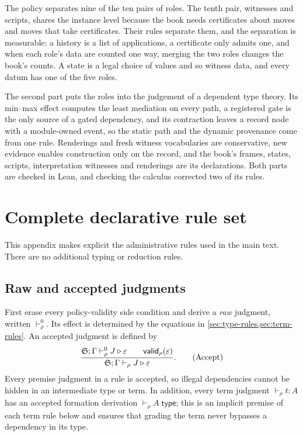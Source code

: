 \documentclass[11pt]{article}
\numberwithin{equation}{section}
\theoremstyle{definition}
\theoremstyle{plain}
\theoremstyle{remark}
\newcommand{\eps}{\varepsilon}
\newcommand{\valid}{\mathsf{valid}}
\newcommand{\jtype}{\mathrel{\mathsf{type}}}
\begin{document}
The policy separates nine of the ten pairs of roles.  The tenth pair,
witnesses and scripts, shares the instance level because the book needs
certificates about moves and moves that take certificates.  Their rules
separate them, and the separation is measurable: a history is a list of
applications, a certificate only admits one, and when each role's data are
counted one way, merging the two roles changes the book's counts.  A state is a legal choice of values and so
witness data, and every datum has one of the five roles.

The second part puts the roles into the judgement of a dependent type
theory.  Its min--max effect computes the least mediation on every path, a
registered gate is the only source of a gated dependency, and its contraction
leaves a record node with a module-owned event, so the static path and the
dynamic provenance come from one rule.  Renderings and fresh witness
vocabularies are conservative, new evidence enables construction only on the
record, and the book's frames, states, scripts, interpretation witnesses and
renderings are its declarations.  Both parts are checked in Lean, and
checking the calculus corrected two of its rules.

\clearpage
\appendix

\section{Complete declarative rule set}\label{app:rules}

This appendix makes explicit the administrative rules used in the main text.
There are no additional typing or reduction rules.

\subsection{Raw and accepted judgments}

First erase every policy-validity side condition and derive a \emph{raw}
judgment, written \(\vdash^{0}_{\rho}\).  Its effect is determined by the equations in
\cref{sec:type-rules,sec:term-rules}.  An accepted judgment is defined by
\[
\frac{
 \AFDeclSignature;\Gamma\vdash^{0}_{\rho} J\triangleright\eps
 \qquad \valid_\rho(\eps)
}{
 \AFDeclSignature;\Gamma\vdash_{\rho} J\triangleright\eps
}.
\tag{Accept}
\]
Every premise judgment in a rule is accepted, so illegal dependencies cannot
be hidden in an intermediate type or term.  In addition, every term judgment
\(\vdash_{\rho}t:A\) has an accepted formation derivation
\(\vdash_{\rho}A\;\jtype\); this is an implicit premise of each term rule below and
ensures that grading the term never bypasses a dependency in its type.
\end{document}
